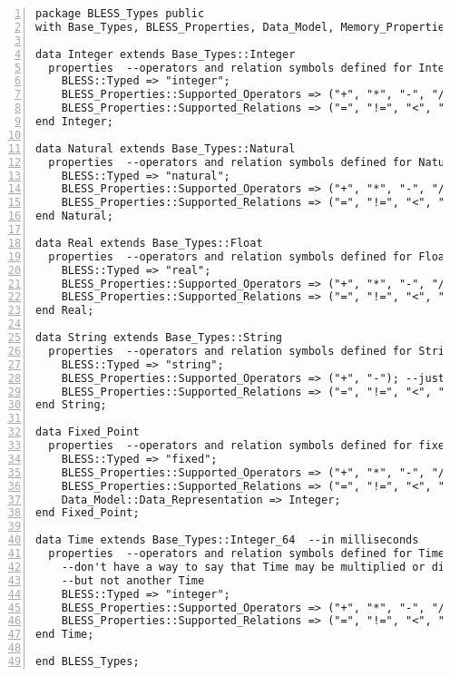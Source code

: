 \singlespacing
\begin{lstlisting}[language=aadl, gobble=0, numbers=left, caption={\lstinline{BLESS_Types} package}, label={listing:aadl:bless_types}]
package BLESS_Types public
with Base_Types, BLESS_Properties, Data_Model, Memory_Properties, BLESS;

data Integer extends Base_Types::Integer
  properties  --operators and relation symbols defined for Integer
    BLESS::Typed => "integer";
    BLESS_Properties::Supported_Operators => ("+", "*", "-", "/", "mod", "rem", "**");
    BLESS_Properties::Supported_Relations => ("=", "!=", "<", "<=", ">=", ">");
end Integer;    
    
data Natural extends Base_Types::Natural
  properties  --operators and relation symbols defined for Natural
    BLESS::Typed => "natural";
    BLESS_Properties::Supported_Operators => ("+", "*", "-", "/", "mod", "rem", "**");
    BLESS_Properties::Supported_Relations => ("=", "!=", "<", "<=", ">=", ">");
end Natural;    
    
data Real extends Base_Types::Float
  properties  --operators and relation symbols defined for Float
    BLESS::Typed => "real";
    BLESS_Properties::Supported_Operators => ("+", "*", "-", "/", "**");
    BLESS_Properties::Supported_Relations => ("=", "!=", "<", "<=", ">=", ">");
end Real;    
    
data String extends Base_Types::String
  properties  --operators and relation symbols defined for String
    BLESS::Typed => "string";
    BLESS_Properties::Supported_Operators => ("+", "-"); --just concatenation
    BLESS_Properties::Supported_Relations => ("=", "!=", "<", "<=", ">=", ">");
end String;    
    
data Fixed_Point
  properties  --operators and relation symbols defined for fixed-point arithmetic
    BLESS::Typed => "fixed";
    BLESS_Properties::Supported_Operators => ("+", "*", "-", "/", "**");
    BLESS_Properties::Supported_Relations => ("=", "!=", "<", "<=", ">=", ">");
    Data_Model::Data_Representation => Integer;
end Fixed_Point;

data Time extends Base_Types::Integer_64  --in milliseconds
  properties  --operators and relation symbols defined for Time
    --don't have a way to say that Time may be multiplied or divided by scalar
    --but not another Time
    BLESS::Typed => "integer";
    BLESS_Properties::Supported_Operators => ("+", "*", "-", "/");
    BLESS_Properties::Supported_Relations => ("=", "!=", "<", "<=", ">=", ">");
end Time;
    
end BLESS_Types;
\end{lstlisting} 
\doublespacing

